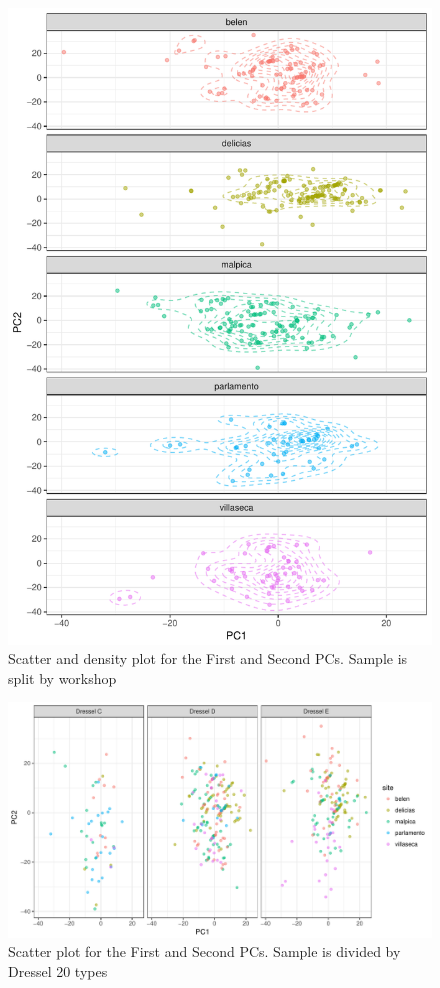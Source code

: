 \documentclass[review]{elsarticle}
\begin{document}
\begin{figure}[htp]
	\centering
\includegraphics[width=\linewidth]{figs/pca}
\caption{Scatter and density plot for the First and Second PCs. Sample is split by workshop}
\label{pca}
\end{figure} 


\begin{figure}[htp]
	\centering
\includegraphics[width=\linewidth]{figs/dresseltypes}
\caption{Scatter plot for the First and Second PCs. Sample is divided by Dressel 20 types}
\label{dressel}
\end{figure} 
\end{document}
